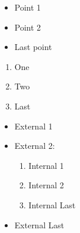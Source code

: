\documentclass{article}
\begin{document}
	
     \begin{itemize}
	\item Point 1
	\item Point 2
	\item Last point
\end{itemize}


\begin{enumerate}
	\item One
	\item Two
	\item Last
\end{enumerate}


\begin{itemize}
	\item External 1
	\item External 2:
	\begin{enumerate}
		\item Internal 1
		\item Internal 2
		\item Internal Last
	\end{enumerate}
	\item External Last
\end{itemize}
\end{document}
